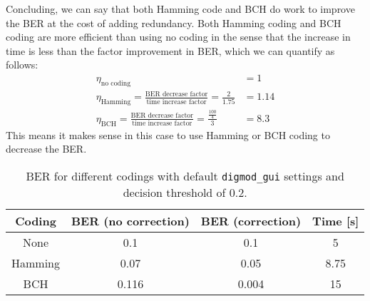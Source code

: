 \documentclass[11pt,titlepage]{report}
\begin{document}
Concluding, we can say that both Hamming code and BCH do work to improve the BER at the cost of adding redundancy. Both Hamming coding and BCH coding are more efficient than using no coding in the sense that the increase in time is less than the factor improvement in BER, which we can quantify as follows:
\begin{align*}
\eta_{\text{no coding}}&=1\\
\eta_{\text{Hamming}}=\frac{\text{BER decrease factor}}{\text{time increase factor}}=\frac{2}{1.75}&=1.14\\
\eta_{\text{BCH}}=\frac{\text{BER decrease factor}}{\text{time increase factor}}=\frac{\frac{100}{4}}{3}&=8.3
\end{align*}
This means it makes sense in this case to use Hamming or BCH coding to decrease the BER.
\begin{table}[H]
	\centering
	\caption{BER for different codings with default \texttt{digmod\_gui} settings and decision threshold of 0.2.}
	\label{tab:task4-diff-coding}
	\begin{tabular}{c c c c}
		\hline\hline
		Coding & BER (no correction) & BER (correction) & Time [s] \\
		\hline
		None & 0.1 & 0.1 & 5\\
		Hamming & 0.07 & 0.05 & 8.75 \\
		BCH & 0.116 & 0.004 & 15\\
		\hline
	\end{tabular}
\end{table}
\end{document}
